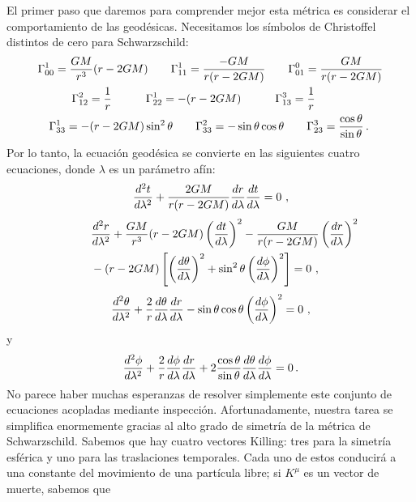 \documentclass[11pt,b5paper,openany,twoside]{book}
\begin{document}
El primer paso que daremos para comprender mejor esta métrica es considerar el comportamiento de las geodésicas.
Necesitamos los símbolos de Christoffel distintos de cero para Schwarzschild:
\begin{align}
&\Gamma^1_{00} = {{GM}\over {r^3}}(r-2GM)\qquad
\Gamma^1_{11} = {{-GM}\over{r(r-2GM)}} \qquad
\Gamma^0_{01} = {{GM}\over{r(r-2GM)}}  \notag \\
&\quad\qquad\Gamma^2_{12} = {1\over r}\qquad\quad
\Gamma^1_{22} = - (r-2GM)\qquad\quad
\Gamma^3_{13} = {1\over r} \notag \\
&\quad\Gamma^1_{33} = -(r-2GM)\sin^2\theta\qquad
\Gamma^2_{33} = -\sin\theta \cos\theta \qquad
\Gamma^3_{23} = {{\cos\theta}\over {\sin\theta}}\,.\label{7.33}
\end{align}
Por lo tanto, la ecuación geodésica se convierte en las siguientes cuatro ecuaciones, donde $\lambda$ es un parámetro afín:
\begin{equation}
{{d^2 t}\over{d\lambda^2}} + {{2GM}\over{r(r-2GM)}}
{{dr}\over{d\lambda}}{{dt}\over{d\lambda}} =0\ ,\label{7.34}
\end{equation}
\begin{align}
\lefteqn{{{d^2 r}\over{d\lambda^2}} + {{GM}\over {r^3}}(r-2GM)
\left({{dt}\over{d\lambda}}\right)^2 - {{GM}\over{r(r-2GM)}}
\left({{dr}\over{d\lambda}}\right)^2}  \notag \\
& -(r-2GM)\left[
\left({{d\theta}\over{d\lambda}}\right)^2+\sin^2\theta
\left({{d\phi}\over{d\lambda}}\right)^2\right] = 0 \ ,\label{7.35}
\end{align}
\begin{equation}
{{d^2 \theta}\over{d\lambda^2}} + {2\over r}{{d\theta}\over{d\lambda}}
{{dr}\over{d\lambda}} - \sin\theta \cos\theta
\left({{d\phi}\over{d\lambda}}\right)^2 = 0\ ,\label{7.36}
\end{equation}
y
\begin{equation}
{{d^2 \phi}\over{d\lambda^2}} + {2\over r}{{d\phi}\over{d\lambda}}
{{dr}\over{d\lambda}} + 2{{\cos\theta}\over {\sin\theta}}
{{d\theta}\over{d\lambda}}{{d\phi}\over{d\lambda}} = 0\,.\label{7.37}
\end{equation}
No parece haber muchas esperanzas de resolver simplemente este conjunto de ecuaciones acopladas mediante inspección.
Afortunadamente, nuestra tarea se simplifica enormemente gracias al alto grado de simetría de la métrica de Schwarzschild.
Sabemos que hay cuatro vectores Killing: tres para la simetría esférica y uno para las traslaciones temporales.
Cada uno de estos conducirá a una constante del movimiento de una partícula libre; si $K^\mu$ es un vector de muerte, sabemos que
\end{document}
